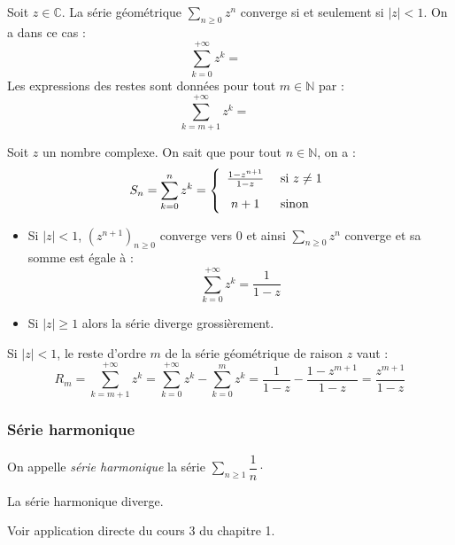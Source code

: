 \documentclass[french,11pt,twoside]{VcCours}
\newcommand{\Sum}[2]{\ensuremath{\textstyle{\sum\limits_{#1}^{#2}}}}
\begin{document}
\begin{Theoreme}{} 
Soit $z \in \mathbb{C}$. La série géométrique $\Sum{n \geq 0}{} z^n$ converge si et seulement si $\vert z \vert <1$. On a dans ce cas : 
$$ \sum_{k=0}^{+ \infty} z^k = \phantom{\frac{1}{1-z}}$$
Les expressions des restes sont données pour tout $m \in \mathbb{N}$ par :
$$ \sum_{k=m+1}^{+ \infty} z^k = \phantom{\frac{z^{m+1}}{1-z}}$$
\end{Theoreme}

\begin{Demonstration}{}  
Soit $z$ un nombre complexe. On sait que pour tout $n \in \mathbb{N}$, on a :
$$ S_n = \sum_{k=0}^n z^k = \left\lbrace \begin{array}{cl}
\frac{1-z^{n+1}}{1-z} & \hbox{ si }  z \neq 1 \\[0.3cm]
n + 1 & \hbox{ sinon} \\
\end{array}\right.$$
\begin{itemize}
\item Si $\vert z \vert < 1$, $(z^{n+1})_{n \geq 0}$ converge vers $0$ et ainsi $\Sum{n\geq 0}{} z^n$ converge et sa somme est égale à :
$$ \sum_{k=0}^{+ \infty} z^k = \frac{1}{1-z}$$
\item Si $\vert z \vert \geq 1$ alors la série diverge grossièrement.
\end{itemize}
Si $\vert z \vert <1$, le reste d'ordre $m$ de la série géométrique de raison $z$ vaut :
$$R_m  = \sum_{k = m+1}^{+ \infty} z^k = \sum_{k = 0}^{+ \infty} z^k - \sum_{k = 0}^{m} z^k = \dfrac{1}{1-z} - \dfrac{1-z^{m+1}}{1 - z} = \dfrac{z^{m+1}}{1-z} $$


\end{Demonstration}

\subsubsection{Série harmonique}

On appelle \emph{série harmonique} la série $\Sum{n \geq 1}{} \dfrac{1}{n} \cdot$

\begin{Theoreme}{} La série harmonique diverge.
\end{Theoreme}

\begin{Demonstration}{} Voir application directe du cours 3 du chapitre 1.
%
\end{Demonstration}
\end{document}
